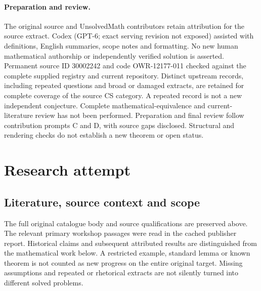 \documentclass[11pt]{article}
\begin{document}
\paragraph{Preparation and review.}
The original source and UnsolvedMath contributors retain attribution for the source extract. Codex (GPT-6; exact serving revision not exposed) assisted with definitions, English summaries, scope notes and formatting. No new human mathematical authorship or independently verified solution is asserted. Permanent source ID 30002242 and code OWR-12177-011 checked against the complete supplied registry and current repository. Distinct upstream records, including repeated questions and broad or damaged extracts, are retained for complete coverage of the source CS category. A repeated record is not a new independent conjecture. Complete mathematical-equivalence and current-literature review has not been performed. Preparation and final review follow contribution prompts C and D, with source gaps disclosed. Structural and rendering checks do not establish a new theorem or open status.
\label{end:30002242}

\section{Research attempt}
\subsection{Literature, source context and scope}
The full original catalogue body and source qualifications are preserved above. The relevant primary workshop passages were read in the cached publisher report. Historical claims and subsequent attributed results are distinguished from the mathematical work below. A restricted example, standard lemma or known theorem is not counted as new progress on the entire original target. Missing assumptions and repeated or rhetorical extracts are not silently turned into different solved problems.
\end{document}
